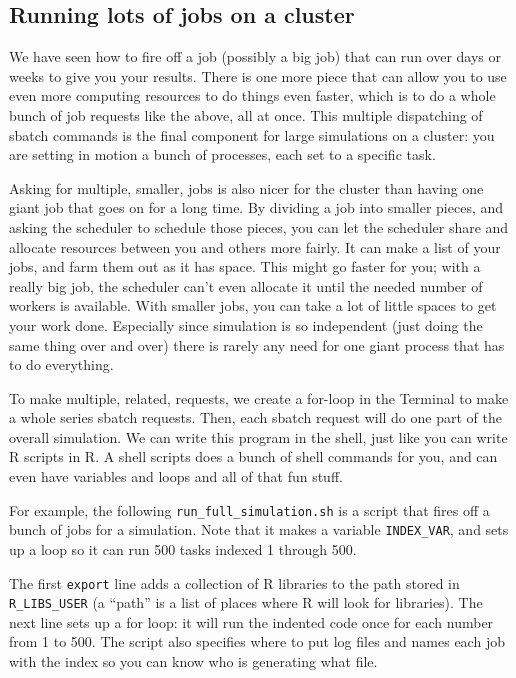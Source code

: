 \documentclass[
]{book}
\begin{document}
\subsection{Running lots of jobs on a cluster}\label{running-lots-of-jobs-on-a-cluster}

We have seen how to fire off a job (possibly a big job) that can run over days or weeks to give you your results.
There is one more piece that can allow you to use even more computing resources to do things even faster, which is to do a whole bunch of job requests like the above, all at once.
This multiple dispatching of sbatch commands is the final component for large simulations on a cluster: you are setting in motion a bunch of processes, each set to a specific task.

Asking for multiple, smaller, jobs is also nicer for the cluster than having one giant job that goes on for a long time.
By dividing a job into smaller pieces, and asking the scheduler to schedule those pieces, you can let the scheduler share and allocate resources between you and others more fairly.
It can make a list of your jobs, and farm them out as it has space.
This might go faster for you; with a really big job, the scheduler can't even allocate it until the needed number of workers is available.
With smaller jobs, you can take a lot of little spaces to get your work done.
Especially since simulation is so independent (just doing the same thing over and over) there is rarely any need for one giant process that has to do everything.

To make multiple, related, requests, we create a for-loop in the Terminal to make a whole series sbatch requests.
Then, each sbatch request will do one part of the overall simulation.
We can write this program in the shell, just like you can write R scripts in R.
A shell scripts does a bunch of shell commands for you, and can even have variables and loops and all of that fun stuff.

For example, the following \texttt{run\_full\_simulation.sh} is a script that fires off a bunch of jobs for a simulation.
Note that it makes a variable \texttt{INDEX\_VAR}, and sets up a loop so it can run 500 tasks indexed 1 through 500.

The first \texttt{export} line adds a collection of R libraries to the path stored in \texttt{R\_LIBS\_USER} (a ``path'' is a list of places where R will look for libraries).
The next line sets up a for loop: it will run the indented code once for each number from 1 to 500.
The script also specifies where to put log files and names each job with the index so you can know who is generating what file.
\end{document}
